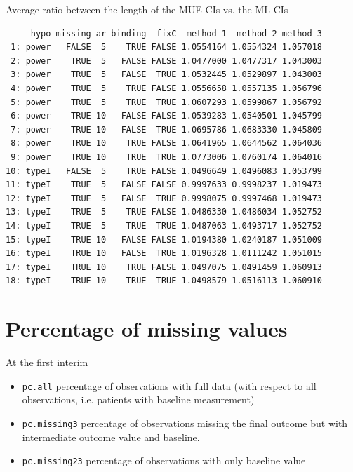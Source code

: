 \documentclass[12pt]{article}
\begin{document}
Average ratio between the length of the MUE CIs vs. the ML CIs
\begin{verbatim}
     hypo missing ar binding  fixC  method 1  method 2 method 3
 1: power   FALSE  5    TRUE FALSE 1.0554164 1.0554324 1.057018
 2: power    TRUE  5   FALSE FALSE 1.0477000 1.0477317 1.043003
 3: power    TRUE  5   FALSE  TRUE 1.0532445 1.0529897 1.043003
 4: power    TRUE  5    TRUE FALSE 1.0556658 1.0557135 1.056796
 5: power    TRUE  5    TRUE  TRUE 1.0607293 1.0599867 1.056792
 6: power    TRUE 10   FALSE FALSE 1.0539283 1.0540501 1.045799
 7: power    TRUE 10   FALSE  TRUE 1.0695786 1.0683330 1.045809
 8: power    TRUE 10    TRUE FALSE 1.0641965 1.0644562 1.064036
 9: power    TRUE 10    TRUE  TRUE 1.0773006 1.0760174 1.064016
10: typeI   FALSE  5    TRUE FALSE 1.0496649 1.0496083 1.053799
11: typeI    TRUE  5   FALSE FALSE 0.9997633 0.9998237 1.019473
12: typeI    TRUE  5   FALSE  TRUE 0.9998075 0.9997468 1.019473
13: typeI    TRUE  5    TRUE FALSE 1.0486330 1.0486034 1.052752
14: typeI    TRUE  5    TRUE  TRUE 1.0487063 1.0493717 1.052752
15: typeI    TRUE 10   FALSE FALSE 1.0194380 1.0240187 1.051009
16: typeI    TRUE 10   FALSE  TRUE 1.0196328 1.0111242 1.051015
17: typeI    TRUE 10    TRUE FALSE 1.0497075 1.0491459 1.060913
18: typeI    TRUE 10    TRUE  TRUE 1.0498579 1.0516113 1.060910
\end{verbatim}

\clearpage

\section{Percentage of missing values}
\label{sec:orgaaefab5}

At the first interim
\begin{itemize}
\item \texttt{pc.all} percentage of observations with full data (with respect to
all observations, i.e. patients with baseline measurement)
\item \texttt{pc.missing3} percentage of observations missing the final outcome
but with intermediate outcome value and baseline.
\item \texttt{pc.missing23} percentage of observations with only baseline value
\end{itemize}
\end{document}
